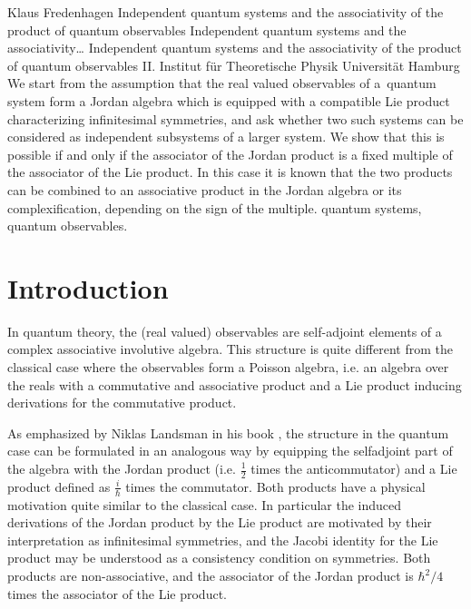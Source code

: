 \begin{artengenv}{Klaus Fredenhagen}
	{Independent quantum systems and the associativity of the product of quantum observables}
	{Independent quantum systems and the associativity\ldots}
	{Independent quantum systems and the associativity of the product of quantum observables}
	{II. Institut f\"ur Theoretische Physik Universit\"at Hamburg}
	{We start from the assumption that the real valued observables of a~quantum system form a Jordan algebra which is equipped with a compatible Lie product characterizing infinitesimal symmetries,
		and ask whether two such systems can be considered as independent subsystems of a larger system. We show that this  is possible if and only if the associator of the Jordan product is a fixed multiple of the associator of the Lie product. In this case it is known that the two products can be combined to an associative product in the Jordan algebra or its complexification, depending on the sign of the multiple.}
	{quantum systems, quantum observables.}
	
	

\section{Introduction}
\lettrine[loversize=0.13,lines=2,lraise=-0.05,nindent=0em,findent=0.2pt]%
{I}{}n quantum theory, the (real valued) observables are self-adjoint elements of a complex associative involutive algebra. This structure is quite different from the classical case where the observables form a Poisson algebra, i.e. an algebra over the reals with a commutative and associative product  and a Lie product inducing derivations for the commutative product. 

As emphasized by Niklas Landsman in his book \parencite*{Landsman}, the structure in the quantum case can be formulated in an analogous way by equipping the selfadjoint part of the algebra with the Jordan product (i.e. $\frac12$ times the anticommutator) and a Lie product defined as $\frac{i}{\hbar}$ times the commutator.
Both products have a physical motivation quite similar to the classical case. In particular the induced derivations of the Jordan product by the Lie product are motivated by their interpretation as infinitesimal symmetries, and the Jacobi identity for the Lie product may be understood as a consistency condition on symmetries. Both products are non-associative, and the associator of the Jordan product is $\hbar^2/4$ times the associator of the Lie product. 


\end{artengenv}
